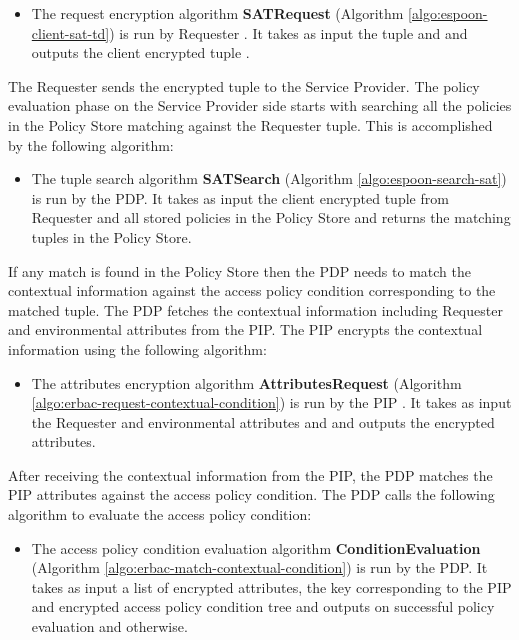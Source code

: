 \documentclass[epsfig,a4paper,11pt,titlepage]{book}
\numberwithin{algorithm}{chapter}
\begin{document}
\begin{itemize}

\item The  request encryption algorithm \textbf{SATRequest} (Algorithm \ref{algo:espoon-client-sat-td}) is run by Requester . It takes as input the  tuple and  and outputs the client encrypted tuple .

\end{itemize}

The Requester sends the encrypted  tuple to the Service Provider. The policy evaluation phase on the Service Provider side starts with searching all the policies in the Policy Store matching against the Requester  tuple. This is accomplished by the following algorithm:

\begin{itemize}

\item The  tuple search algorithm \textbf{SATSearch} (Algorithm \ref{algo:espoon-search-sat}) is run by the \gls{PDP}. It takes as input the client encrypted tuple  from Requester  and all stored policies in the Policy Store  and returns the matching tuples in the Policy Store.

\end{itemize}

If any match is found in the Policy Store then the \gls{PDP} needs to match the contextual information against the access policy condition corresponding to the matched tuple. The \gls{PDP} fetches the contextual information including Requester and environmental attributes from the \gls{PIP}. The \gls{PIP} encrypts the contextual information using the following algorithm:

\begin{itemize}

\item The attributes encryption algorithm \textbf{AttributesRequest} (Algorithm \ref{algo:erbac-request-contextual-condition}) is run by the \gls{PIP} . It takes as input the Requester and environmental attributes and  and outputs the encrypted attributes.

\end{itemize}

After receiving the contextual information from the \gls{PIP}, the \gls{PDP} matches the \gls{PIP} attributes against the access policy condition. The \gls{PDP} calls the following algorithm to evaluate the access policy condition:

\begin{itemize}

\item The access policy condition evaluation algorithm \textbf{ConditionEvaluation} (Algorithm \ref{algo:erbac-match-contextual-condition}) is run by the \gls{PDP}. It takes as input a list of encrypted attributes, the key  corresponding to the \gls{PIP}  and encrypted access policy condition tree and outputs  on successful policy evaluation and  otherwise.

\end{itemize}
\end{document}
